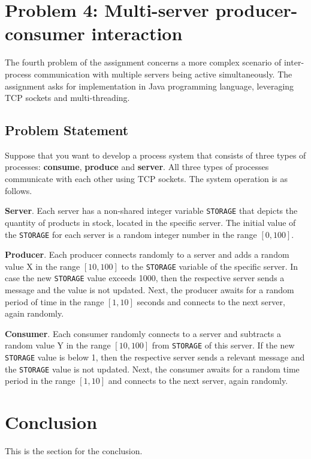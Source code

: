 \documentclass[acmlarge]{acmart}
\newcommand{\storage}{{\small \texttt{STORAGE}} }
\begin{document}
\section{Problem 4: Multi-server producer-consumer interaction}
\label{section:problem4}
The fourth problem of the assignment concerns a more complex scenario of inter-process communication with multiple servers being active simultaneously. The assignment asks for implementation in Java programming language, leveraging TCP sockets and multi-threading.
\subsection{Problem Statement}
Suppose that you want to develop a process system that consists of three types of processes: \textbf{consume}, \textbf{produce} and \textbf{server}. All three types of processes communicate with each other using TCP sockets. The system operation is as follows.

\textbf{Server}. Each server has a non-shared integer variable \storage that depicts the quantity of products in stock, located in the specific server. The initial value of the \storage for each server is a random integer number in the range $[0, 100]$.

\textbf{Producer}. Each producer connects randomly to a server and adds a random value X in the range $[10, 100]$ to the \storage variable of the specific server. In case the new \storage value exceeds 1000, then the respective server sends a message and the value is not updated. Next, the producer awaits for a random period of time in the range $[1, 10]$ seconds and connects to the next server, again randomly.

\textbf{Consumer}. Each consumer randomly connects to a server and subtracts a random value Y in the range $[10, 100]$ from \storage of this server. If the new \storage value is below 1, then the respective server sends a relevant message and the \storage value is not updated. Next, the consumer awaits for a random time period in the range $[1, 10]$ and connects to the next server, again randomly.


\section{Conclusion}
\label{section:conclusion}
This is the section for the conclusion.
\end{document}
